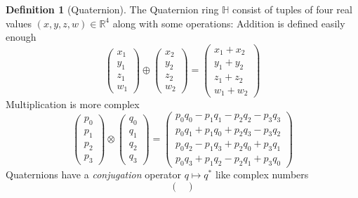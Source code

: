 \documentclass{amsart}
\theoremstyle{definition}
\newtheorem{definition}[theorem]{Definition}
\theoremstyle{remark}
\numberwithin{equation}{section}
\begin{document}
\begin{definition}[Quaternion]
  The Quaternion ring $\mathbb{H}$ consist of tuples of four real values $(x, y, z, w)\in\mathbb{R}^4$ along with some operations: Addition is defined easily enough
  \begin{equation}
    \begin{pmatrix}
      x_1 \\
      y_1 \\
      z_1 \\
      w_1
    \end{pmatrix} \oplus
    \begin{pmatrix}
      x_2 \\
      y_2 \\
      z_2 \\
      w_2
    \end{pmatrix} =
    \begin{pmatrix}
      x_1 + x_2 \\
      y_1 + y_2 \\
      z_1 + z_2 \\
      w_1 + w_2
    \end{pmatrix}
  \end{equation}
  Multiplication is more complex
  \begin{equation} \label{eqn:multiplication}
    \begin{pmatrix}
      p_0 \\
      p_1 \\
      p_2 \\
      p_3
    \end{pmatrix} \otimes 
    \begin{pmatrix}
      q_0 \\
      q_1 \\
      q_2 \\
      q_3
    \end{pmatrix} =
    \begin{pmatrix}
      p_0q_0 - p_1q_1 - p_2q_2 - p_3q_3 \\
      p_0q_1 + p_1q_0 + p_2q_3 - p_3q_2 \\
      p_0q_2 - p_1q_3 + p_2q_0 + p_3q_1 \\
      p_0q_3 + p_1q_2 - p_2q_1 + p_3q_0
    \end{pmatrix}
  \end{equation}
  Quaternions have a \emph{conjugation} operator $q\mapsto q^*$ like complex numbers
  \begin{equation}
    \begin{pmatrix}

\end{pmatrix}
\end{equation}
\end{definition}
\end{document}
